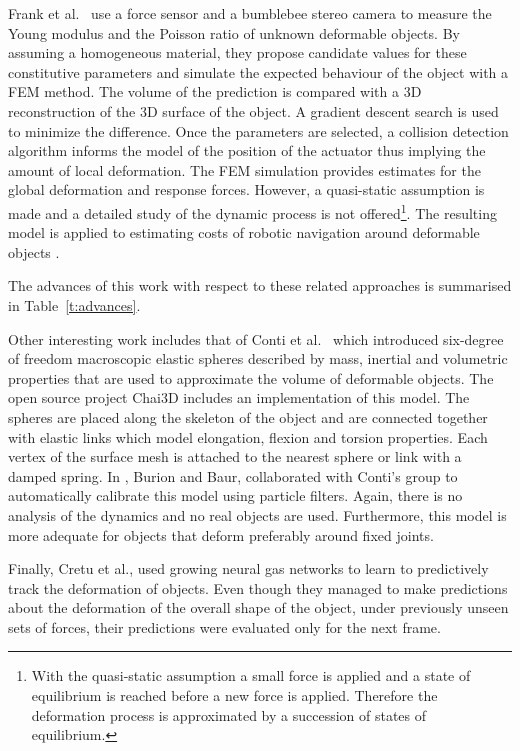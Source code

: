 \documentclass[journal]{IEEEtran}
\newcommand{\tref}[1]{Table~\ref{#1}}
\newcounter{algorithm}
\begin{document}
Frank et al.\ \cite{Frank2010} use a force sensor and a bumblebee stereo camera to measure the Young modulus and the Poisson ratio of unknown deformable objects.  By assuming a homogeneous material, they propose candidate values for these constitutive parameters and simulate the expected behaviour of the object with a FEM method.  The volume of the prediction is compared with a 3D reconstruction of the 3D surface of the object.  A gradient descent search is used to minimize the difference.  Once the parameters are selected, a collision detection algorithm informs the model of the position of the actuator thus implying the amount of local deformation.  The FEM simulation provides estimates for the global deformation and response forces.  However, a quasi-static assumption is made and a detailed study of the dynamic process is not offered\footnote{With the quasi-static assumption a small force is applied and a state of equilibrium is reached before a new force is applied.  Therefore the deformation process is approximated 
by a succession of states of equilibrium.}.  The resulting model is applied to estimating costs of robotic navigation around deformable objects \cite{Frank2011}.

The advances of this work with respect to these related approaches is summarised in \tref{t:advances}.

Other interesting work includes that of Conti et al.\ \cite{Conti2003} which introduced six-degree of freedom macroscopic elastic spheres described by mass, inertial and volumetric properties that are used to approximate the volume of deformable objects. The open source project Chai3D includes an implementation of this model. The spheres are placed along the skeleton of the object and are connected together with elastic links which model elongation, flexion and torsion properties. Each vertex of the surface mesh is attached to the nearest sphere or link with a damped spring.  In \cite{Burion2008}, Burion and Baur, collaborated with Conti's group to automatically calibrate this model using particle filters.  Again, there is no analysis of the dynamics and no real objects are used.  Furthermore, this model is more adequate for objects that deform preferably around fixed joints.

Finally, Cretu et al., used growing neural gas networks to learn to predictively track the deformation of objects.  Even though they managed to make predictions about the deformation of the overall shape of the object, under previously unseen sets of forces, their predictions were evaluated only for the next frame.
\end{document}
